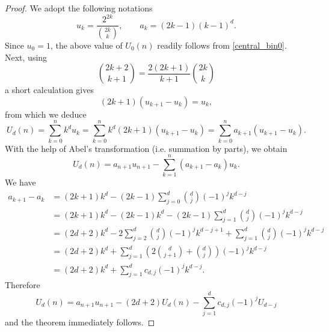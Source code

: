 \documentclass[10pt,a4paper]{amsart}
\begin{document}
\begin{proof}
We adopt the following notations
$$u_k = \frac{2^{2k}}{\binom{2k}{k}},\qquad  a_k = (2k-1)(k-1)^d.$$
Since $u_0=1$, the above value of $U_0(n)$ readily follows from \eqref{central_bin0}. Next, using 
$$\binom{2k+2}{k+1} = \frac{2(2k+1)}{k+1}\binom{2k}{k}$$
a short calculation gives
$$(2k+1)(u_{k+1}-u_k) = u_k,$$
from which we deduce
$$U_d(n) = \sum_{k=0}^n k^d u_k = \sum_{k=0}^n k^d (2k+1)(u_{k+1} - u_k) = \sum_{k=0}^n a_{k+1}(u_{k+1}-u_k).$$
With the help of Abel's transformation (i.e. summation by parts), we obtain
$$U_d(n) = a_{n+1}u_{n+1} - \sum_{k=1}^n (a_{k+1}-a_k) u_k.$$
We have
\begin{align*} 
a_{k+1}-a_k&=(2k+1)k^d-(2k-1)\sum_{j=0}^d\binom{d}{j}(-1)^j k^{d-j}\\
&=(2k+1)k^d-(2k-1)k^d-(2k-1)\sum_{j=1}^d\binom{d}{j}(-1)^j k^{d-j}\\
&=(2d+2)k^d-2\sum_{j=2}^d \binom{d}{j}(-1)^j k^{d-j+1}+\sum_{j=1}^d\binom{d}{j}(-1)^j k^{d-j}\\
&=(2d+2)k^d+\sum_{j=1}^d\left(2\binom{d}{j+1}+\binom{d}{j}\right)(-1)^jk^{d-j}\\
&=(2d+2)k^d+\sum_{j=1}^d c_{d,j}(-1)^j k^{d-j}.
\end{align*}
Therefore
$$U_d(n) = a_{n+1}u_{n+1} - (2d+2) U_d(n) - \sum_{j=1}^d c_{d,j}(-1)^j U_{d-j}$$
and the theorem immediately follows.
\end{proof}
\end{document}
